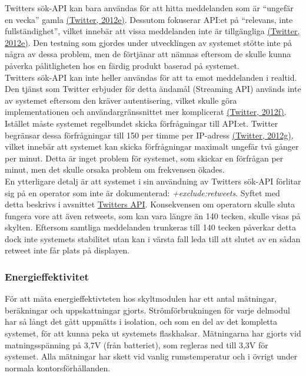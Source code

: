 \documentclass[a4paper,11pt]{article}
\begin{document}
Twitters sök-API kan bara användas för att hitta meddelanden som är “ungefär en vecka” gamla \hyperref[twitter]{(Twitter, 2012e)}. Dessutom fokuserar API:et på “relevans, inte fullständighet”, vilket innebär att vissa meddelanden inte är tillgängliga \hyperref[twitter]{(Twitter, 2012e)}. Den testning som gjordes under utvecklingen av systemet stötte inte på några av dessa problem, men de förtjänar att nämnas eftersom de skulle kunna påverka pålitligheten hos en färdig produkt baserad på systemet.\\

Twitters sök-API kan inte heller användas för att ta emot meddelanden i realtid. Den tjänst som Twitter erbjuder för detta ändamål (Streaming API) används inte av systemet eftersom den kräver autentisering, vilket skulle göra implementationen och användargränssnittet mer komplicerat \hyperref[twitter]{(Twitter, 2012f)}. Istället måste systemet regelbundet skicka förfrågningar till API:et. Twitter begränsar dessa förfrågningar till 150 per timme per IP-adress \hyperref[twitter]{(Twitter, 2012g)}, vilket innebär att systemet kan skicka förfrågningar maximalt ungefär två gånger per minut. Detta är inget problem för systemet, som skickar en förfrågan per minut, men det skulle orsaka problem om frekvensen ökades.\\

En ytterligare detalj är att systemet i sin användning av Twitters sök-API förlitar sig på en operator som inte är dokumenterad: {\it +exclude:retweets}. Syftet med detta beskrivs i avsnittet \hyperref[twitterapi]{Twitters API}. Konsekvensen om operatorn skulle sluta fungera vore att även retweets, som kan vara längre än 140 tecken, skulle visas på skylten. Eftersom samtliga meddelanden trunkeras till 140 tecken påverkar detta dock inte systemets stabilitet utan kan i värsta fall leda till att slutet av en sådan retweet inte får plats på displayen.\\

\subsubsection{Energieffektivitet}
För att mäta energieffektivteten hos skyltmodulen har ett antal mätningar, beräkningar och uppskattningar gjorts. Strömförbrukningen för varje delmodul har så långt det gått uppmätts i isolation, och som en del av det kompletta systemet, för att kunna peka ut systemets flaskhalsar. Mätningarna har gjorts vid matningsspänning på 3,7V (från batteriet), som regleras ned till 3,3V för systemet. Alla mätningar har skett vid vanlig rumstemperatur och i övrigt under normala kontorsförhållanden.
\end{document}
